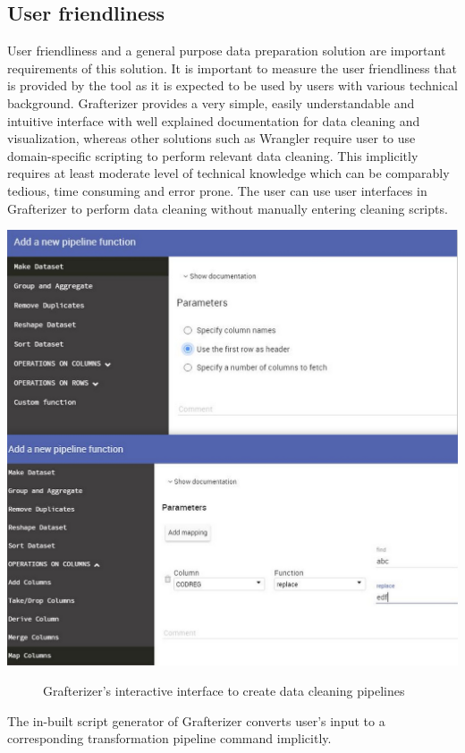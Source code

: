 \subsection{User friendliness}
User friendliness and a general purpose data preparation solution are important requirements of this solution. It is important to measure the user friendliness that is provided by the tool as it is expected to be used by users with various technical background. Grafterizer provides a very simple, easily understandable and intuitive interface with well explained documentation for  data cleaning and visualization, whereas other solutions such as Wrangler\cite{2011-wrangler}\cite{openrefine} require user to use domain-specific scripting to perform relevant data cleaning. This implicitly requires at least moderate level of technical knowledge which can be comparably tedious, time consuming and error prone. The user can use user interfaces in Grafterizer to perform data cleaning without manually entering cleaning scripts. 
\begin{center}
	\includegraphics[width=38em]{./Figures/userinteraction}
	\begin{figure}[htbp]
    \caption{Grafterizer's interactive interface to create data cleaning pipelines}
    \label{fig:datacleaning}
	\end{figure}
\end{center}
The in-built script generator of Grafterizer converts user's input to a corresponding transformation pipeline command implicitly.  
